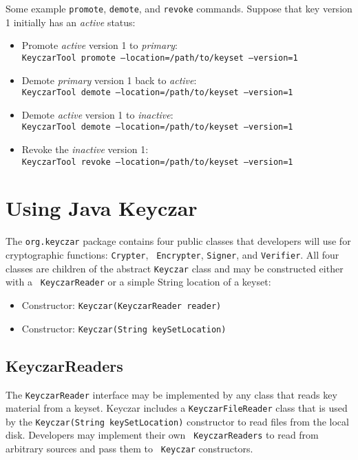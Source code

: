 \documentclass{llncs}
\begin{document}
Some example {\tt promote}, {\tt demote}, and {\tt revoke} commands. Suppose
that key version 1 initially has an {\it active} status:
\begin{itemize}
\item Promote {\it active} version 1 to {\it primary}: \\
{\tt KeyczarTool promote --location=/path/to/keyset --version=1}
\item Demote {\it primary} version 1 back to {\it active}: \\
{\tt KeyczarTool demote --location=/path/to/keyset --version=1}
\item Demote {\it active} version 1 to {\it inactive}: \\
{\tt KeyczarTool demote --location=/path/to/keyset --version=1}
\item Revoke the {\it inactive} version 1: \\
{\tt KeyczarTool revoke --location=/path/to/keyset --version=1}
\end{itemize}

\section{Using Java Keyczar}

The {\tt org.keyczar} package contains four public classes that
developers will use for cryptographic functions: {\tt Crypter}, {\tt
Encrypter}, {\tt Signer}, and {\tt Verifier}. All four classes are children
of the abstract {\tt Keyczar} class and may be constructed either with a {\tt
KeyczarReader} or a simple String location of a keyset:
\begin{itemize}
  \item Constructor: {\tt Keyczar(KeyczarReader reader)}
  \item Constructor: {\tt Keyczar(String keySetLocation)}
\end{itemize} 

\subsection{KeyczarReaders}

The {\tt KeyczarReader} interface may be implemented by any class that reads
key material from a keyset. Keyczar includes a {\tt KeyczarFileReader} class
that is used by the {\tt Keyczar(String keySetLocation)} constructor to read
files from the local disk. Developers may implement their own {\tt
KeyczarReaders} to read from arbitrary sources and pass them to {\tt
Keyczar} constructors.
\end{document}
